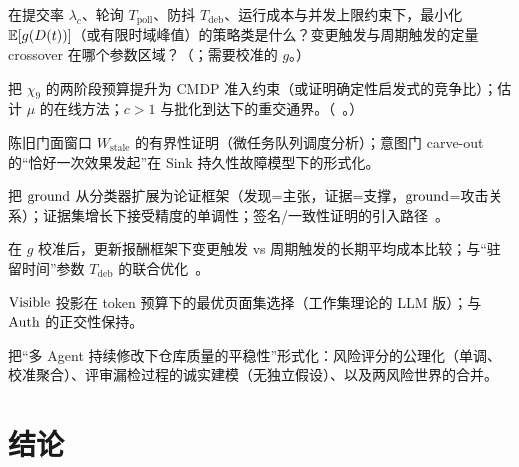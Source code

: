 \begin{openproblem}[RQ1 高频提交下的证据滞后最小化]
在提交率 $\lambda_c$、轮询 $T_{\mathrm{poll}}$、防抖 $T_{\mathrm{deb}}$、运行成本与并发上限约束下，最小化 $\operatorname{\mathbb{E}}[g(D(t))]$（或有限时域峰值）的策略类是什么？变更触发与周期触发的定量 crossover 在哪个参数区域？（\PROPOSED；需要校准的 $g$。）
\end{openproblem}
\begin{openproblem}
把 $\chi_9$ 的两阶段预算提升为 CMDP 准入约束（或证明确定性启发式的竞争比）；估计 $\mu$ 的在线方法；$c>1$ 与批化到达下的重交通界。（\PROPOSED~\cite{altman1999}。）
\end{openproblem}
\begin{openproblem}[RQ3 撤销与异步生命周期的安全一致性]
陈旧门面窗口 $W_{\mathrm{stale}}$ 的有界性证明（微任务队列调度分析）；意图门 carve-out 的“恰好一次效果发起”在 Sink 持久性故障模型下的形式化。
\end{openproblem}
\begin{openproblem}
把 $\operatorname{ground}$ 从分类器扩展为论证框架（发现=主张，证据=支撑，$\operatorname{ground}$=攻击关系）；证据集增长下接受精度的单调性；签名/一致性证明的引入路径~\cite{crosby2009}。
\end{openproblem}
\begin{openproblem}[RQ5 事件触发评审的何时更优]
在 $g$ 校准后，更新报酬框架下变更触发 vs 周期触发的长期平均成本比较；与“驻留时间”参数 $T_{\mathrm{deb}}$ 的联合优化~\cite{astrom1999,tabuada2007}。
\end{openproblem}
\begin{openproblem}[RQ6 上下文分配作为约束信息分配]
$\operatorname{Visible}$ 投影在 token 预算下的最优页面集选择（工作集理论的 LLM 版）；与 $\operatorname{Auth}$ 的正交性保持。
\end{openproblem}
\begin{openproblem}
把“多 Agent 持续修改下仓库质量的平稳性”形式化：风险评分的公理化（单调、校准聚合）、评审漏检过程的诚实建模（无独立假设）、以及两风险世界的合并。
\end{openproblem}

\section*{结论}

